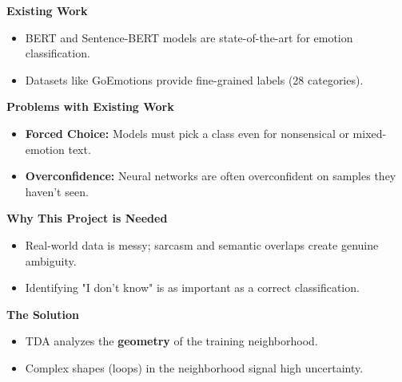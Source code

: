 \textbf{Existing Work}
\begin{itemize}
    \item BERT and Sentence-BERT models are state-of-the-art for emotion classification.
    \item Datasets like GoEmotions provide fine-grained labels (28 categories).
\end{itemize}

\vspace{0.2cm}
\textbf{Problems with Existing Work}
\begin{itemize}
    \item \textbf{Forced Choice:} Models must pick a class even for nonsensical or mixed-emotion text.
    \item \textbf{Overconfidence:} Neural networks are often overconfident on samples they haven't seen.
\end{itemize}

\vspace{0.2cm}
\textbf{Why This Project is Needed}
\begin{itemize}
    \item Real-world data is messy; sarcasm and semantic overlaps create genuine ambiguity.
    \item Identifying "I don't know" is as important as a correct classification.
\end{itemize}

\vspace{0.2cm}
\textbf{The Solution}
\begin{itemize}
    \item TDA analyzes the \textbf{geometry} of the training neighborhood.
    \item Complex shapes (loops) in the neighborhood signal high uncertainty.
\end{itemize}
